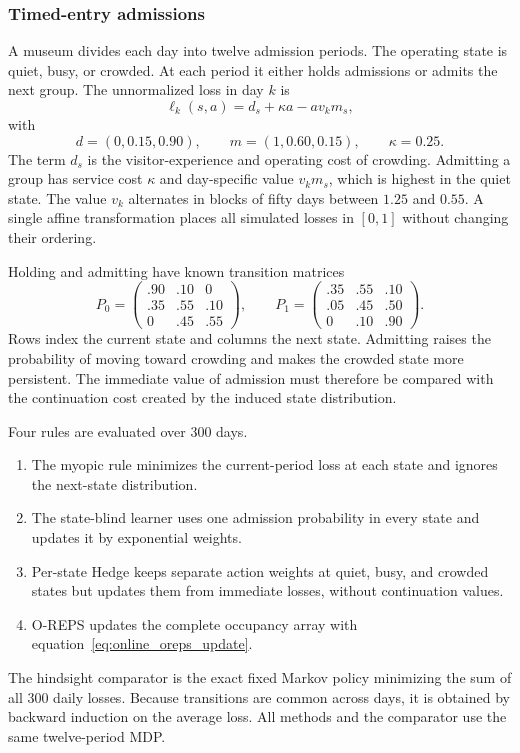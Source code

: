 \subsubsection{Timed-entry admissions}
\label{sec:online_museum}

A museum divides each day into twelve admission periods. The operating state is quiet, busy, or crowded. At each period it either holds admissions or admits the next group. The unnormalized loss in day $k$ is
\begin{equation}
\ell_k(s,a)
=
d_s+\kappa a-a v_km_s,
\label{eq:online_museum_loss}
\end{equation}
with
\[
d=(0,0.15,0.90),
\qquad
m=(1,0.60,0.15),
\qquad
\kappa=0.25.
\]
The term $d_s$ is the visitor-experience and operating cost of crowding. Admitting a group has service cost $\kappa$ and day-specific value $v_km_s$, which is highest in the quiet state. The value $v_k$ alternates in blocks of fifty days between $1.25$ and $0.55$. A single affine transformation places all simulated losses in $[0,1]$ without changing their ordering.

Holding and admitting have known transition matrices
\begin{equation}
P_0=
\begin{pmatrix}
.90&.10&0\\
.35&.55&.10\\
0&.45&.55
\end{pmatrix},
\qquad
P_1=
\begin{pmatrix}
.35&.55&.10\\
.05&.45&.50\\
0&.10&.90
\end{pmatrix}.
\label{eq:online_museum_transitions}
\end{equation}
Rows index the current state and columns the next state. Admitting raises the probability of moving toward crowding and makes the crowded state more persistent. The immediate value of admission must therefore be compared with the continuation cost created by the induced state distribution.

Four rules are evaluated over 300 days.
\begin{enumerate}
\item The myopic rule minimizes the current-period loss at each state and ignores the next-state distribution.
\item The state-blind learner uses one admission probability in every state and updates it by exponential weights.
\item Per-state Hedge keeps separate action weights at quiet, busy, and crowded states but updates them from immediate losses, without continuation values.
\item O-REPS updates the complete occupancy array with equation~\eqref{eq:online_oreps_update}.
\end{enumerate}
The hindsight comparator is the exact fixed Markov policy minimizing the sum of all 300 daily losses. Because transitions are common across days, it is obtained by backward induction on the average loss. All methods and the comparator use the same twelve-period MDP.

